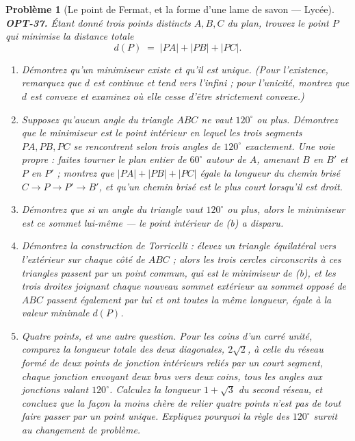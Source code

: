 \documentclass[11pt]{article}
\newtheorem{problem}{Problème}
\begin{document}
\bigskip

\begin{problem}[{Le point de Fermat, et la forme d'une lame de savon --- Lycée}]
\textbf{OPT-37.} Étant donné trois points distincts $A, B, C$ du plan, trouvez le point $P$ qui minimise la distance totale
\[ d(P) \;=\; |PA| + |PB| + |PC| . \]
\begin{enumerate}
\item[(a)] Démontrez qu'un minimiseur existe et qu'il est unique. (Pour l'existence, remarquez que $d$ est continue et tend vers l'infini ; pour l'unicité, montrez que $d$ est convexe et examinez où elle cesse d'être strictement convexe.)
\item[(b)] Supposez qu'aucun angle du triangle $ABC$ ne vaut $120^\circ$ ou plus. Démontrez que le minimiseur est le point intérieur en lequel les trois segments $PA, PB, PC$ se rencontrent selon trois angles de $120^\circ$ exactement. Une voie propre : faites tourner le plan entier de $60^\circ$ autour de $A$, amenant $B$ en $B'$ et $P$ en $P'$ ; montrez que $|PA| + |PB| + |PC|$ égale la longueur du chemin brisé $C \to P \to P' \to B'$, et qu'un chemin brisé est le plus court lorsqu'il est droit.
\item[(c)] Démontrez que si un angle du triangle vaut $120^\circ$ ou plus, alors le minimiseur est ce sommet lui-même --- le point intérieur de (b) a disparu.
\item[(d)] Démontrez la construction de Torricelli : élevez un triangle équilatéral vers l'extérieur sur chaque côté de $ABC$ ; alors les trois cercles circonscrits à ces triangles passent par un point commun, qui est le minimiseur de (b), et les trois droites joignant chaque nouveau sommet extérieur au sommet opposé de $ABC$ passent également par lui et ont toutes la même longueur, égale à la valeur minimale $d(P)$.
\item[(e)] Quatre points, et une autre question. Pour les coins d'un carré unité, comparez la longueur totale des deux diagonales, $2\sqrt{2}$, à celle du réseau formé de deux points de jonction intérieurs reliés par un court segment, chaque jonction envoyant deux bras vers deux coins, tous les angles aux jonctions valant $120^\circ$. Calculez la longueur $1 + \sqrt{3}$ du second réseau, et concluez que la façon la moins chère de relier quatre points n'est pas de tout faire passer par un point unique. Expliquez pourquoi la règle des $120^\circ$ survit au changement de problème.
\end{enumerate}

\end{problem}
\end{document}
